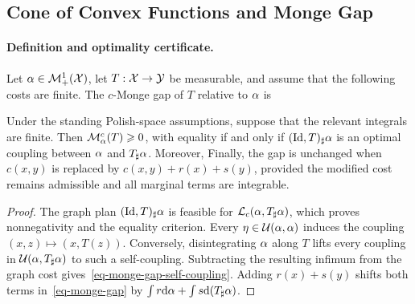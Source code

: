 \subsection{Cone of Convex Functions and Monge Gap}
\label{sec-monge-gap}
\paragraph{Definition and optimality certificate.}
\begin{defn}\label{def-monge-gap}
Let $\alpha\in\mathcal{M}_+^1(\mathcal{X})$, let $T:\mathcal{X}\to\mathcal{Y}$ be measurable, and assume that the following costs are finite. The $c$-Monge gap of $T$ relative to $\alpha$ is
\end{defn}
\begin{prop}\label{prop-monge-gap-properties}
Under the standing Polish-space assumptions, suppose that the relevant integrals are finite. Then $\mathcal M_\alpha^c(T)\geqslant0$, with equality if and only if $(\mathrm{Id},T)_\sharp\alpha$ is an optimal coupling between $\alpha$ and $T_\sharp\alpha$. Moreover,
Finally, the gap is unchanged when $c(x,y)$ is replaced by $c(x,y)+r(x)+s(y)$, provided the modified cost remains admissible and all marginal terms are integrable.
\end{prop}
\begin{proof}
The graph plan $(\mathrm{Id},T)_\sharp\alpha$ is feasible for $\mathcal{L}_c(\alpha,T_\sharp\alpha)$, which proves nonnegativity and the equality criterion. Every $\eta\in\mathcal{U}(\alpha,\alpha)$ induces the coupling $(x,z)\mapsto(x,T(z))$. Conversely, disintegrating $\alpha$ along $T$ lifts every coupling in $\mathcal{U}(\alpha,T_\sharp\alpha)$ to such a self-coupling. Subtracting the resulting infimum from the graph cost gives~\eqref{eq-monge-gap-self-coupling}. Adding $r(x)+s(y)$ shifts both terms in~\eqref{eq-monge-gap} by $\int r\mathrm{d}\alpha+\int s\mathrm{d}(T_\sharp\alpha)$.
\end{proof}
